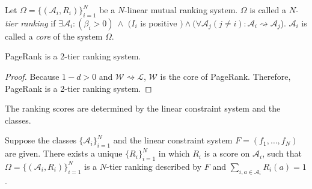 \documentclass[lnicst]{svmultln}
\begin{document}
\begin{definition}
Let $\Omega = \{(\mathcal{A}_i,R_i)\}^N_{i=1}$ be a $N$-linear mutual ranking system. $\Omega$ is called a $N$-\emph{tier ranking} if $\exists \mathcal{A}_i: (\beta_i >0)~\wedge$ $(I_i$ is positive $)\wedge (\forall \mathcal{A}_j(j\neq i): \mathcal{A}_i\rightsquigarrow\mathcal{A}_j$). $\mathcal{A}_i$ is called a \emph{core} of the system $\Omega$.
\end{definition}
\begin{proposition}
PageRank is a 2-tier ranking system.
\end{proposition}
\begin{proof}
Because $1-d > 0$ and $\mathcal{W} \rightsquigarrow \mathcal{L}$, $\mathcal{W}$ is the core of PageRank. Therefore, PageRank is a 2-tier ranking system.
\end{proof}
The  ranking scores  are determined by  the linear constraint system and the classes.
\begin{proposition}
Suppose the classes $\{\mathcal{A}_i\}^N_{i=1}$ and the linear constraint system $F = (f_1,\ldots,f_N)$  are given. There exists a unique $\{R_i\}^N_{i=1}$ in which $R_i$ is a score on $\mathcal{A}_i$, such that $\Omega = \{(\mathcal{A}_i,R_i)\}^N_{i=1}$ is a $N$-tier ranking described by $F$ and $\sum_{i,a\in \mathcal{A}_i }R_i(a)=1$.
\end{proposition}
\end{document}
